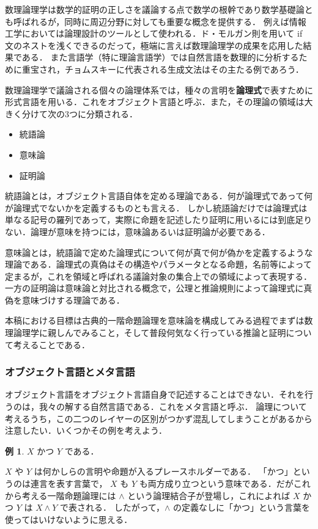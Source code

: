 \documentclass[uplatex,a4paper,dvipdfmx]{jsarticle}
\theoremstyle{definition}
\newtheorem{example}{例}
\begin{document}
        数理論理学は数学的証明の正しさを議論する点で数学の根幹であり数学基礎論とも呼ばれるが，同時に周辺分野に対しても重要な概念を提供する．
        例えば情報工学においては論理設計のツールとして使われる．ド・モルガン則を用いて if 文のネストを浅くできるのだって，極端に言えば数理論理学の成果を応用した結果である．
        また言語学（特に理論言語学）では自然言語を数理的に分析するために重宝され，チョムスキーに代表される生成文法はその主たる例であろう．

        数理論理学で議論される個々の論理体系では，種々の言明を\textbf{論理式}で表すために形式言語を用いる．これをオブジェクト言語と呼ぶ．また，その理論の領域は大きく分けて次の3つに分類される．

        \begin{itemize}
            \item 統語論
            \item 意味論
            \item 証明論
        \end{itemize}

        統語論とは，オブジェクト言語自体を定める理論である．何が論理式であって何が論理式でないかを定義するものとも言える．
        しかし統語論だけでは論理式は単なる記号の羅列であって，実際に命題を記述したり証明に用いるには到底足りない．論理が意味を持つには，意味論あるいは証明論が必要である．

        意味論とは，統語論で定めた論理式について何が真で何が偽かを定義するような理論である．論理式の真偽はその構造やパラメータとなる命題，名前等によって定まるが，これを領域と呼ばれる議論対象の集合上での領域によって表現する．
        一方の証明論は意味論と対比される概念で，公理と推論規則によって論理式に真偽を意味づけする理論である．

        本稿における目標は古典的一階命題論理を意味論を構成してみる過程でまずは数理論理学に親しんでみること，そして普段何気なく行っている推論と証明について考えることである．

        \subsubsection{オブジェクト言語とメタ言語}
            オブジェクト言語をオブジェクト言語自身で記述することはできない．それを行うのは，我々の解する自然言語である．これをメタ言語と呼ぶ．
            論理について考えるうち，この二つのレイヤーの区別がつかず混乱してしまうことがあるから注意したい．いくつかその例を考えよう．

            \begin{example}
                $X$ かつ $Y$ である．
            \end{example}
            $X$ や $Y$ は何かしらの言明や命題が入るプレースホルダーである．
            「かつ」というのは連言を表す言葉で， $X$ も $Y$ も両方成り立つという意味である．だがこれから考える一階命題論理には $\land$ という論理結合子が登場し，これによれば  $X$ かつ $Y$ は $X \land Y$ で表される．
            したがって，$\land$ の定義なしに「かつ」という言葉を使ってはいけないように思える．
\end{document}
